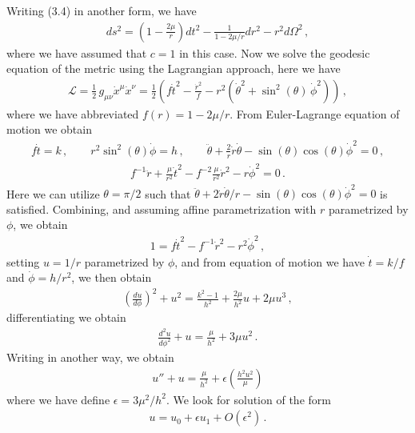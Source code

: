 \documentclass[11pt, onesided]{book}
\theoremstyle{break}
\theoremstyle{break}
\begin{document}
Writing (3.4) in another form, we have
\begin{align*}
ds^2 = \left( 1 - \frac{2\mu}{r}\right)dt^2 - \frac{1}{1 -2\mu/r}dr^2 - r^2 d\Omega^2\,,
\end{align*}
where we have assumed that $c=1$ in this case. Now we solve the geodesic equation of the metric using the Lagrangian approach, here we have
\begin{align}
\mathcal{L} =\frac{1}{2}\, g_{\mu\nu} \dot{x}^\mu \dot{x}^\nu =\frac{1}{2}\left(f \dot{t}^2 - \frac{\dot{r}^2}{f} - r^2 (\dot{\theta}^2 + \sin^2(\theta) \, \dot{\phi}^2)\right)\,,
\end{align}
where we have abbreviated $f(r) = 1 - 2\mu/r$. From Euler-Lagrange equation of motion we obtain
\begin{align*}
f \dot{t} = k \,,\qquad r^2 \sin^2(\theta) \dot{\phi} = h\,,\qquad \ddot{\theta} + \frac{2}{r} \dot{r}\dot{\theta} - \sin(\theta) \cos(\theta) \dot{\phi}^2 = 0\,,
\end{align*}
\begin{align*}
f^{-1}\ddot{r} + \frac{\mu}{r^2} \dot{t}^2 - f^{-2}\frac{\mu}{r^2}\dot{r}^2 - r\dot{\phi}^2 = 0 \,.
\end{align*}
Here we can utilize $\theta = \pi/2$ such that $\ddot{\theta} + 2 \dot{r}\dot{\theta}/r - \sin(\theta) \cos(\theta) \dot{\phi}^2 = 0$ is satisfied. Combining, and assuming affine parametrization with $r$ parametrized by $\phi$, we obtain
\begin{align*}
1 = f \dot{t}^2 - f^{-1}\dot{r}^2 - r^2\dot{\phi}^2\,,
\end{align*}
setting $u = 1/r$ parametrized by $\phi$, and from equation of motion we have $\dot{t} = k / f$ and $\dot{\phi} = h/r^2$, we then obtain
\begin{align*}
\left( \frac{du}{d\phi}\right)^2 + u^2  = \frac{k^2 - 1}{h^2} + \frac{2\mu}{h^2} u  + 2\mu u^3\,,
\end{align*}
differentiating we obtain
\begin{align*}
\frac{d^2 u}{d\phi^2} + u = \frac{\mu}{h^2} + 3\mu u^2\,.
\end{align*}
Writing in another way, we obtain
\begin{align*}
u'' + u = \frac{\mu}{h^2} + \epsilon \left( \frac{h^2 u^2}{\mu}\right)
\end{align*}
where we have define $\epsilon = 3\mu^2/h^2$. We look for solution of the form
\begin{align*}
u = u_0 + \epsilon u_1  + O(\epsilon^2)\,.
\end{align*}
\end{document}

